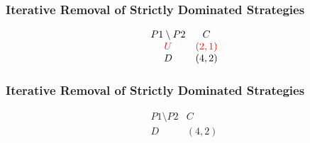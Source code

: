 \begin{frame}
    \frametitle{Iterative Removal of Strictly Dominated Strategies}
    \begin{equation*}
        \begin{matrix}
            P1\setminus P2 & C \\
            \textcolor{red}{U} & \textcolor{red}{(2,1)} \\
            D & (4,2) \\
        \end{matrix}
    \end{equation*}
\end{frame}


\begin{frame}
    \frametitle{Iterative Removal of Strictly Dominated Strategies}
    \begin{equation*}
        \begin{matrix}
            P1\setminus P2 & C \\
            D & (4,2) \\
        \end{matrix}
    \end{equation*}
\end{frame}
